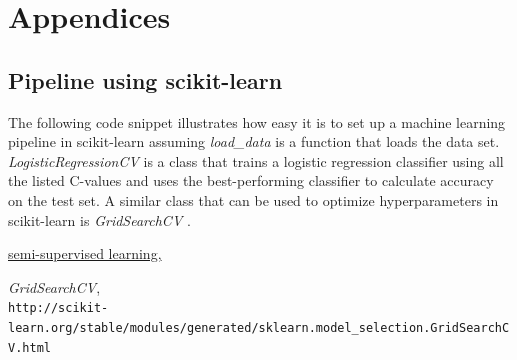 \documentclass[fleqn,10pt]{SelfArx} %
\begin{document}

\section{Appendices}

\subsection{Pipeline using scikit-learn} \label{sklearn-example}

The following code snippet illustrates how easy it is to set up a machine
learning pipeline in scikit-learn assuming \textit{load\_data} is a function that
loads the data set. \textit{LogisticRegressionCV} is a class that trains a
logistic regression classifier using all the listed C-values and uses the
best-performing classifier to calculate accuracy on the test set. A similar
class that can be used to optimize hyperparameters in scikit-learn is
\textit{GridSearchCV} \cite{gridsearchcv}.




\begin{thebibliography}{2}

  \href{http://scikit-learn.org/stable/modules/generated/sklearn.semi\_supervised.LabelSpreading.html}{semi-supervised learning,}

  \textit{GridSearchCV}, \\
  \texttt{http://scikit-learn.org/stable/modules/generated/sklearn.model\_selection.GridSearchCV.html}
\end{thebibliography}

\end{document}

